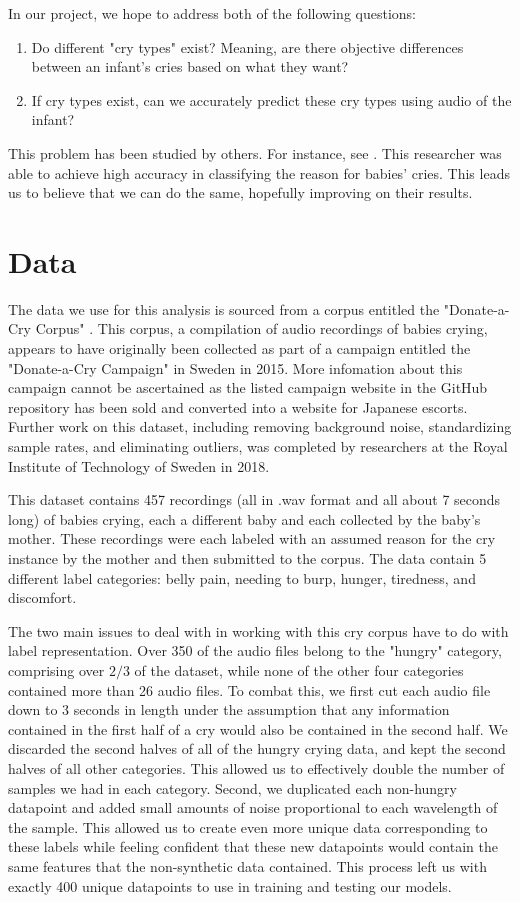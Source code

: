 \documentclass[11pt]{article}
\begin{document}
In our project, we hope to address both of the following questions:
\begin{enumerate}
   \item Do different "cry types" exist? Meaning, are there objective differences between an infant's cries based on what they want?
   \item If cry types exist, can we accurately predict these cry types using audio of the infant?
\end{enumerate}

This problem has been studied by others. For instance, see \cite{previous_cry_classification_research}.
This researcher was able to achieve high accuracy in classifying the reason for babies' cries.
This leads us to believe that we can do the same, hopefully improving on their results.



\section{Data}
The data we use for this analysis is sourced from a corpus entitled
the "Donate-a-Cry Corpus" \cite{donateacry}.
This corpus, a compilation of audio recordings of babies crying, appears to have originally been collected as part of a campaign entitled the "Donate-a-Cry Campaign" in Sweden in 2015.
More infomation about this campaign cannot be ascertained as the listed campaign website in the GitHub repository has been sold and converted into a website for Japanese escorts.
Further work on this dataset, including removing background noise, standardizing sample rates, and eliminating outliers, was completed by researchers at the Royal Institute of Technology of Sweden in 2018.

This dataset contains 457 recordings (all in .wav format and all about 7 seconds long) of babies crying, each a different baby and each collected by the baby's mother.
These recordings were each labeled with an assumed reason for the cry instance by the mother and then submitted to the corpus.
The data contain 5 different label categories: belly pain, needing to burp, hunger, tiredness, and discomfort.

The two main issues to deal with in working with this cry corpus have to do with label representation.
Over 350 of the audio files belong to the "hungry" category, comprising over $2/3$ of the dataset, while none of the other four categories contained more than 26 audio files.
To combat this, we first cut each audio file down to 3 seconds in length under the assumption that any information contained in the first half of a cry would also be contained in the second half.
We discarded the second halves of all of the hungry crying data, and kept the second halves of all other categories.
This allowed us to effectively double the number of samples we had in each category.
Second, we duplicated each non-hungry datapoint and added small amounts of noise proportional to each wavelength of the sample.
This allowed us to create even more unique data corresponding to these labels while feeling confident that these new datapoints would contain the same features that the non-synthetic data contained.
This process left us with exactly 400 unique datapoints to use in training and testing our models.
\end{document}
